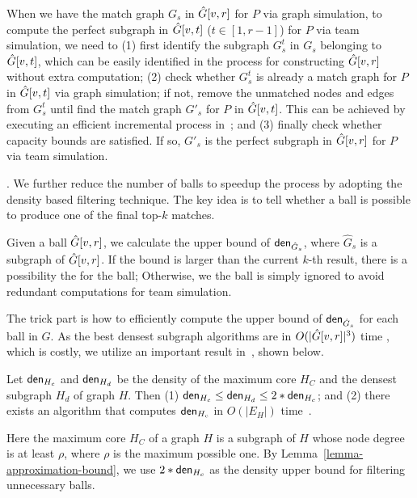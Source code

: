 When we have the match graph $G_s$ in $\hat{G}{[v, r]}$ for $P$ via graph simulation, to compute the perfect subgraph in $\hat{G}{[v, t]}$ ($t \in [1,r-1]$) for $P$ via team simulation, we need to
(1) first identify the subgraph $G_s^{t}$ in $G_s$ belonging to $\hat{G}{[v, t]}$, which can be easily identified in the process for constructing $\hat{G}{[v, r]}$ without extra computation;
(2) check whether $G_s^{t}$ is already a match graph for $P$ in $\hat{G}{[v, t]}$ via graph simulation; if not, remove the unmatched nodes and edges from $G_s^{t}$ until find the match graph $G'_s$ for $P$ in $\hat{G}{[v, t]}$. This can be achieved by executing an efficient incremental process in~\cite{FanWW13-tods}; and
(3) finally check whether capacity bounds are satisfied. If so, $G'_s$ is the perfect subgraph in $\hat{G}{[v, r]}$ for $P$ via team simulation.

. We further reduce the number of balls to speedup the process by adopting the density based filtering technique.
The key idea is to tell whether a ball is possible to produce one of the final top-$k$ matches.

Given a ball $\hat{G}{[v,r]}$, we calculate the upper bound of ${\mathsf{den}}_{\hat{G}_s}$,
where $\hat{G}_s$ is a subgraph of $\hat{G}{[v,r]}$.
If the bound is larger than the current $k$-th result, \ie there is a possibility the for the ball;
Otherwise, we the ball is simply ignored to avoid redundant computations for  team simulation.

The trick part is how to efficiently compute the upper bound of ${\mathsf{den}}_{\hat{G}_s}$ for each ball in $G$.
As the best densest subgraph algorithms are in $O(|\hat{G}{[v,r]}|^3)$ time \cite{maximumDenseSubgraph}, which is costly,
we utilize an important result in~\cite{EVMK12}, shown below.



\begin{lemma}
	\label{lemma-approximation-bound}
	Let ${\mathsf{den}}_{H_{c}}$ and ${\mathsf{den}}_{H_{d}}$ be the density of the maximum core  $H_{C}$  and the  densest subgraph $H_{d}$ of graph $H$. Then (1) ${\mathsf{den}}_{H_{c}}\leq {\ensuremath {\mathsf{den}}}_{H_{d}} \leq 2*{\mathsf{den}}_{H_{c}}$; and (2) there exists an algorithm that computes ${\mathsf{den}}_{H_{c}}$ in $O(|E_H|)$ time~\cite{EVMK12}.
\end{lemma}


Here the maximum core $H_{C}$ of a graph $H$ is a subgraph of $H$ whose node degree is at least $\rho$, where $\rho$ is the maximum possible one. By Lemma~\ref{lemma-approximation-bound}, we use $2*{\mathsf{den}}_{H_{c}}$ as the density upper bound for filtering unnecessary balls.


